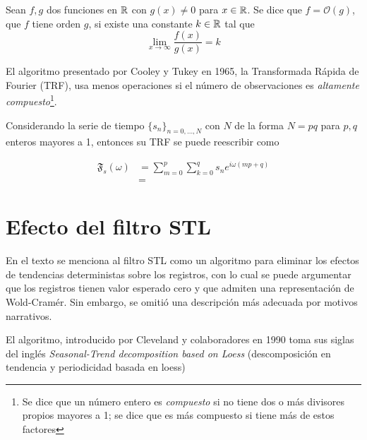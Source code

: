 \begin{defn}
Sean $f, g$ dos funciones en $\mathbb{R}$ con $g(x)\neq 0$ para $x\in \mathbb{R}$. Se dice que $f = \mathcal{O}(g)$,
que $f$ tiene orden $g$, si existe una constante $k\in \mathbb{R}$ tal que
\begin{equation*}
\lim_{x\rightarrow \infty} \frac{f(x)}{g(x)} = k
\end{equation*}
\label{orden}
\end{defn}

El algoritmo presentado por Cooley y Tukey en 1965, la Transformada Rápida de Fourier 
(TRF), usa menos operaciones si el número de observaciones es \textit{altamente 
compuesto}\footnote{Se dice que un número entero es \textit{compuesto} si no tiene dos o más
divisores propios mayores a 1; se dice que es más compuesto si tiene más de estos factores}.

Considerando la serie de tiempo $\{s_n\}_{n=0,\dots,N}$ con $N$ de la forma $N= p q$ para 
$p, q$ enteros mayores a 1, entonces su TRF se puede reescribir como

\begin{align*}
\mathfrak{F}_s(\omega) &= \sum_{m = 0}^{p} \sum_{k=0}^{q} s_n e^{i \omega (mp + q)} 
\\
&= 
\end{align*}


\section{Efecto del filtro STL}

En el texto se menciona al filtro STL como un algoritmo para eliminar los efectos de tendencias
deterministas sobre los registros, con lo cual se puede argumentar que los registros tienen
valor esperado cero y que admiten una representaci\'on de Wold-Cram\'er. Sin embargo, se omiti\'o
una descripci\'on m\'as adecuada por motivos narrativos.

El algoritmo, introducido por Cleveland y colaboradores en 1990 \cite{Cleveland1990} toma sus siglas
del ingl\'es \textit{Seasonal-Trend decomposition based on Loess} (descomposici\'on en tendencia y
periodicidad basada en loess)


